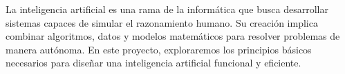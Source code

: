 La inteligencia artificial es una rama de la informática que busca desarrollar 
sistemas capaces de simular el razonamiento humano. 
Su creación implica combinar algoritmos, 
datos y modelos matemáticos para resolver problemas de manera autónoma. 
En este proyecto, exploraremos los principios básicos necesarios para diseñar 
una inteligencia artificial funcional y eficiente.
